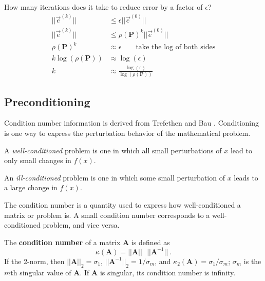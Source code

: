 \documentclass[12pt]{article}
\newcommand{\ve}[1]{\ensuremath{\mathbf{#1}}}
\begin{document}
How many iterations does it take to reduce error by a factor of $\epsilon$? 
%
\begin{align}
|| \vec{e}^{(k)} || &\leq \epsilon || \vec{e}^{(0)} || \nonumber \\
%
|| \vec{e}^{(k)} || &\leq \rho(\ve{P})^k || \vec{e}^{(0)} || \nonumber \\
%
\rho(\ve{P})^k &\approx \epsilon 
\qquad \text{take the log of both sides}\nonumber \\
%
k \log(\rho(\ve{P})) &\approx \log(\epsilon)\nonumber \\
%
k &\approx \frac{\log(\epsilon)}{\log(\rho(\ve{P}))} \nonumber
\end{align}

\subsection{Preconditioning}
Condition number information is derived from Trefethen and Bau \cite{Trefethen1997}. Conditioning is one way to express the perturbation behavior of the mathematical problem. 

A \emph{well-conditioned} problem is one in which all small perturbations of $x$ lead to only small changes in $f(x)$. 

An \emph{ill-conditioned} problem is one in which some small perturbation of $x$ leads to a large change in $f(x)$. 

The condition number is a quantity used to express how well-conditioned a matrix or problem is. A small condition number corresponds to a well-conditioned problem, and vice versa. 

The \textbf{condition number} of a matrix $\mathbf{A}$ is defined as
\[\kappa(\mathbf{A}) = ||\mathbf{A}|| \text{ }||\mathbf{A}^{-1}|| \:.
\]
%
If the 2-norm, then $||\mathbf{A}||_{2} = \sigma_{1}$, $||\mathbf{A}^{-1}||_{2} = 1 / \sigma_{m}$, and $\kappa_{2}(\mathbf{A}) = \sigma_{1} / \sigma_{m}$; $\sigma_{m}$ is the $m$th singular value of $\ve{A}$. If $\mathbf{A}$ is singular, its condition number is infinity. 
\end{document}
